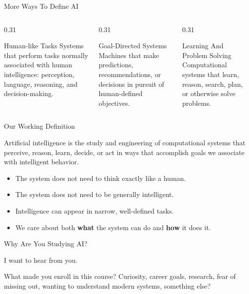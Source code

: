 \documentclass[aspectratio=169]{beamer}
\begin{document}
\begin{frame}[shrink=3]{More Ways To Define AI}
  \begin{columns}[T,onlytextwidth]
    \begin{column}{0.31\textwidth}
      \begin{block}{Human-like Tasks}
        Systems that perform tasks normally associated with human intelligence: perception, language, reasoning, and decision-making.
      \end{block}
    \end{column}
    \begin{column}{0.31\textwidth}
      \begin{block}{Goal-Directed Systems}
        Machines that make predictions, recommendations, or decisions in pursuit of human-defined objectives.
      \end{block}
    \end{column}
    \begin{column}{0.31\textwidth}
      \begin{block}{Learning And Problem Solving}
        Computational systems that learn, reason, search, plan, or otherwise solve problems.
      \end{block}
    \end{column}
  \end{columns}
\end{frame}

\begin{frame}{Our Working Definition}
  \begin{cpdefinition}
    Artificial intelligence is the study and engineering of computational systems that perceive, reason, learn, decide, or act in ways that accomplish goals we associate with intelligent behavior.
  \end{cpdefinition}
  \vspace{0.14in}
  \begin{itemize}
    \item The system does not need to think exactly like a human.
    \item The system does not need to be generally intelligent.
    \item Intelligence can appear in narrow, well-defined tasks.
    \item We care about both \textbf{what} the system can do and \textbf{how} it does it.
  \end{itemize}
\end{frame}

\begin{frame}{Why Are You Studying AI?}
  \begin{center}
    {\Huge I want to hear from you.}
  \end{center}
  \vspace{0.16in}
  \begin{activity}
    What made you enroll in this course? Curiosity, career goals, research, fear of missing out, wanting to understand modern systems, something else?
  \end{activity}
\end{frame}
\end{document}

